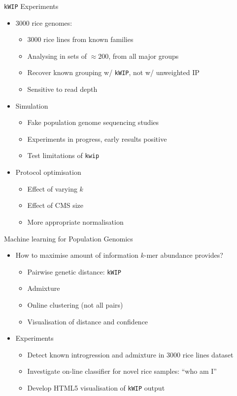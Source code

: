 \documentclass[t]{beamer}
\begin{document}
\begin{frame}{\texttt{kWIP} Experiments}
  \begin{itemize}
    \item 3000 rice genomes:
      \begin{itemize}
        \item 3000 rice lines from known families
        \item Analysing in sets of $\approx 200$, from all major groups
        \item Recover known grouping w/ \texttt{kWIP}, not w/ unweighted IP
        \item Sensitive to read depth
      \end{itemize}
    \item Simulation
      \begin{itemize}
        \item Fake population genome sequencing studies
        \item Experiments in progress, early results positive
        \item Test limitations of \texttt{kwip}
      \end{itemize}
    \item Protocol optimisation
      \begin{itemize}
        \item Effect of varying $k$
        \item Effect of CMS size
        \item More appropriate normalisation
      \end{itemize}
  \end{itemize}
\end{frame}


\begin{frame}{Machine learning for Population Genomics}
  \begin{itemize}
    \item How to maximise amount of information $k$-mer abundance provides?
      \begin{itemize}
        \item Pairwise genetic distance: \texttt{kWIP}
        \item Admixture
        \item Online clustering (not all pairs)
        \item Visualisation of distance and confidence
      \end{itemize}
      \pause
    \item Experiments
      \begin{itemize}
        \item Detect known introgression and admixture in 3000 rice lines
          dataset
        \item Investigate on-line classifier for novel rice samples: ``who am I''
        \item Develop HTML5 visualisation of \texttt{kWIP} output
      \end{itemize}
  \end{itemize}
\end{frame}
\end{document}
